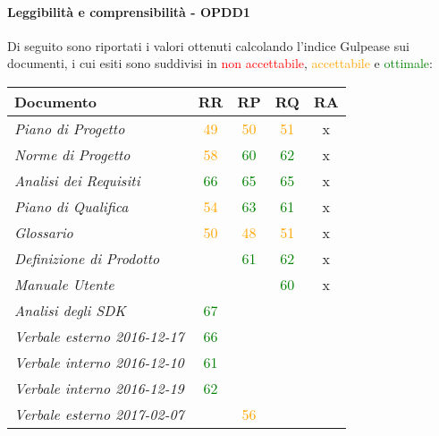 \documentclass[PdQ.tex]{subfiles}
\begin{document}
		\paragraph{Leggibilità e comprensibilità - OPDD1}
				Di seguito sono riportati i valori ottenuti calcolando l'indice Gulpease sui documenti, i cui esiti sono suddivisi in \textcolor{red}{non accettabile}, \textcolor{orange}{accettabile} e \textcolor{green}{ottimale}:
				\begin{table}[H]
				\centering
				\begin{tabular}{l c c c c}
					\hline
					\rule[-0.3cm]{0cm}{0.8cm}
					\textbf{Documento} & \textbf{RR} & \textbf{RP} & \textbf{RQ} & \textbf{RA}\\
					\hline
					\rule[0cm]{0cm}{0.4cm}
					\textit{Piano di Progetto} & \textcolor{orange}{49} & \textcolor{orange}{50} & \textcolor{orange}{51} & x \\
					\rule[0cm]{0cm}{0.4cm}
					\textit{Norme di Progetto}& \textcolor{orange}{58} & \textcolor{green}{60} & \textcolor{green}{62} & x \\
					\rule[0cm]{0cm}{0.4cm}
					\textit{Analisi dei Requisiti} & \textcolor{green}{66} & \textcolor{green}{65} & \textcolor{green}{65} & x \\
					\rule[0cm]{0cm}{0.4cm}
					\textit{Piano di Qualifica} & \textcolor{orange}{54} & \textcolor{green}{63} & \textcolor{green}{61} & x \\
					\rule[0cm]{0cm}{0.4cm}
					\textit{Glossario} & \textcolor{orange}{50} & \textcolor{orange}{48} & \textcolor{orange}{51} & x\\
					\rule[0cm]{0cm}{0.4cm}
					\textit{Definizione di Prodotto} & & \textcolor{green}{61} & \textcolor{green}{62} & x \\
					\rule[0cm]{0cm}{0.4cm}
					\textit{Manuale Utente} & & & \textcolor{green}{60} & x \\
					\rule[0cm]{0cm}{0.4cm}
					\textit{Analisi degli SDK} & \textcolor{green}{67} & & & \\
					\rule[0cm]{0cm}{0.4cm}
					\textit{Verbale esterno 2016-12-17} & \textcolor{green}{66} & & &\\
					\rule[0cm]{0cm}{0.4cm}
					\textit{Verbale interno 2016-12-10} & \textcolor{green}{61} & & &\\
					\rule[0cm]{0cm}{0.4cm}
					\textit{Verbale interno 2016-12-19} & \textcolor{green}{62} & & &\\
					\rule[0cm]{0cm}{0.4cm}
					\textit{Verbale esterno 2017-02-07} & & \textcolor{orange}{56} & & \\

\end{tabular}
\end{table}
\end{document}
